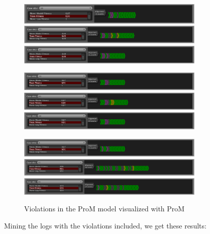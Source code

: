 \begin{figure}[H]
\centering
\includegraphics[width=0.8\textwidth]{figures/violation_case/10-prom.png}
\includegraphics[width=0.8\textwidth]{figures/violation_case/20-prom.png}
\includegraphics[width=0.8\textwidth]{figures/violation_case/47-prom.png}

\includegraphics[width=0.8\textwidth]{figures/violation_case/53-prom.png}
\includegraphics[width=0.8\textwidth]{figures/violation_case/63-prom.png}
\includegraphics[width=0.8\textwidth]{figures/violation_case/88-prom.png}

\includegraphics[width=0.8\textwidth]{figures/violation_case/6-prom.png}
\includegraphics[width=0.8\textwidth]{figures/violation_case/72-prom.png}
\includegraphics[width=0.8\textwidth]{figures/violation_case/81-prom.png}
\caption{Violations in the ProM model visualized with ProM}
\label{fig:violations_prom}
\end{figure}

Mining the logs with the violations included, we get these results:

